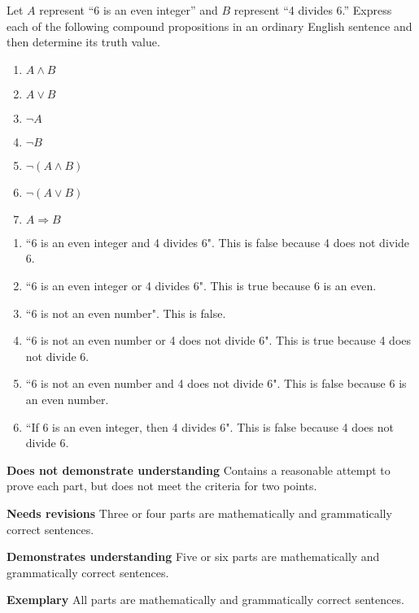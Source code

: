 \documentclass[letterpaper, 11 pt]{../ximera}
\begin{document}
\begin{problem}\label{ernst-prob2.19}%
Let \(A\)  represent ``6 is an even integer” and \(B\)  represent ``4 divides 6.” Express each of the following compound propositions in an ordinary English sentence and then determine its truth value.%
    \begin{enumerate}[label=\alph*.]
            \item \( A\land B\)%
            \item \( A\lor B\)%
            \item \( \neg A\)%
            \item \( \neg B\)%
            \item \( \neg (A\land B)\)%
            \item \( \neg(A\lor B)\)%
            \item \( A\Rightarrow B\)%
    \end{enumerate}
%
    \begin{solution}

        \begin{enumerate}[label=(\alph*)]
            \item ``6 is an even integer and 4 divides 6". This is false because 4 does not divide 6.%
            \item ``6 is an even integer or 4 divides 6". This is true because 6 is an even.%
            \item ``6 is not an even number". This is false.%
            \item ``6 is not an even number or 4 does not divide 6". This is true because 4 does not divide 6.%
            \item ``6 is not an even number and 4 does not divide 6". This is false because 6 is an even number.%
            \item ``If 6 is an even integer, then 4 divides 6". This is false because 4 does not divide 6.%
        \end{enumerate}
    \end{solution}

    \begin{writeRubric}
        \item \textbf{Does not demonstrate understanding}
        Contains a reasonable attempt to prove each part, but does not meet the criteria for two points.
        \item \textbf{Needs revisions}
        Three or four parts are mathematically and grammatically correct sentences.
        \item \textbf{Demonstrates understanding}
        Five or six parts are mathematically and grammatically correct sentences.
        \item \textbf{Exemplary}
        All parts are mathematically and grammatically correct sentences.
    \end{writeRubric}
%
\end{problem}
\end{document}
